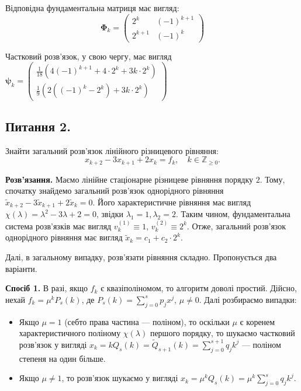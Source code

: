 \documentclass{hw_template}
\begin{document}
\begin{example}
    Відповідна фундаментальна матриця має вигляд:
    \begin{equation*}
        \boldsymbol{\Phi}_k = \begin{pmatrix}
            2^k & (-1)^{k+1} \\
            2^{k+1} & (-1)^k
        \end{pmatrix}
    \end{equation*}

    Частковий розв'язок, у свою чергу, має вигляд $\boldsymbol{\psi}_k = \begin{pmatrix}
        \frac{1}{18}\left(4(-1)^{k+1}+4 \cdot 2^k + 3k\cdot 2^k\right) \\
        \frac{1}{9}\left(2((-1)^k - 2^k)+ 3k \cdot 2^k\right)
    \end{pmatrix}$
\end{example}

\newpage

\subsection{Питання 2.}
\begin{problems}
    Знайти загальний розв'язок лінійного різницевого рівняння:
    \begin{equation*}
        x_{k+2} - 3x_{k+1} + 2x_k = f_k, \quad k \in \mathbb{Z}_{\geq 0}.
    \end{equation*}
\end{problems}

\textbf{Розв'язання.} Маємо лінійне стаціонарне різницеве рівняння порядку $2$. Тому, спочатку 
знайдемо загальний розв'язок однорідного рівняння $\widetilde{x}_{k+2} - 3\widetilde{x}_{k+1} + 2\widetilde{x}_k = 0$. Його характеристичне
рівняння має вигляд $\chi(\lambda) = \lambda^2 - 3\lambda + 2 = 0$, звідки $\lambda_1 = 1, \lambda_2 = 2$. Таким чином,
фундаментальна система розв'язків має вигляд $v^{(1)}_k \equiv 1$, $v^{(2)}_k \equiv 2^k$. Отже, 
загальний розв'язок однорідного рівняння має вигляд $\widetilde{x}_k = c_1 + c_2\cdot 2^k$.

Далі, в загальному випадку, розв'язати рівняння складно. Пропонується два варіанти.

\textbf{Спосіб 1.} В разі, якщо $f_k$ є квазіполіномом, то алгоритм доволі
простий. Дійсно, нехай $f_k = \mu^kP_s(k)$, де $P_s(k) = \sum_{j=0}^s p_jx^j$,
$\mu \neq 0$. Далі розбираємо випадки:
\begin{itemize}
    \item Якщо $\mu = 1$ (себто права частина --- поліном), то оскільки $\mu$ є коренем 
    характеристичного поліному $\chi(\lambda)$ першого порядку, то шукаємо частковий розв'язок 
    у вигляді $x_k = kQ_s(k)=\widetilde{Q}_{s+1}(k)=\sum_{j=0}^{s+1}q_jk^j$ --- поліном степеня на один більше. 
    \item Якщо $\mu \neq 1$, то розв'язок шукаємо у вигляді $x_k = \mu^kQ_s(k)=\mu^k\sum_{j=0}^s q_jk^j$. 
\end{itemize}
\end{document}
